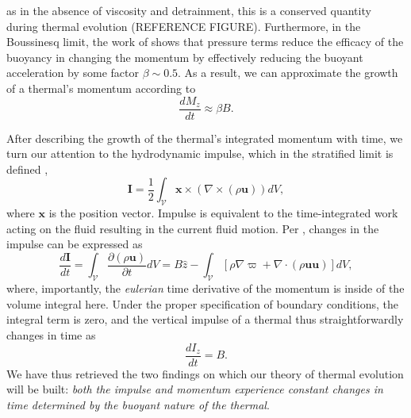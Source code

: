 \documentclass[twocolumn, amsmath, amsfonts, amssymb, trackchanges]{aastex62}
\newcommand{\Div}[1]{\ensuremath{\nabla\cdot\left( #1\right)}}
\newcommand{\grad}{\ensuremath{\nabla}}
\begin{document}
as in the absence of viscosity and detrainment, this is a conserved quantity during thermal evolution (REFERENCE FIGURE). 
Furthermore, in the Boussinesq limit, the work of \citet{tarshish&all2018} shows that pressure terms reduce the efficacy of the buoyancy in changing the momentum by effectively reducing the buoyant acceleration by some factor $\beta \sim 0.5$. 
As a result, we can approximate the growth of a thermal's momentum according to
\begin{equation}
\frac{d M_z}{dt} \approx \beta B.
\label{eqn:theory_momentum}
\end{equation}

After describing the growth of the thermal's integrated momentum with time, we turn our attention to the hydrodynamic impulse, which in the stratified limit is defined
\citep{shivamoggi2010},
\begin{equation}
\bm{I} = \frac{1}{2}\int_{\mathcal{V}} \bm{x}\times(\grad\times(\rho\bm{u}))dV,
\end{equation}
where $\bm{x}$ is the position vector. 
Impulse is equivalent to the time-integrated work acting on the fluid resulting in the current fluid motion. 
Per \citet{shivamoggi2010}, changes in the impulse can be expressed as
\begin{equation*}
\frac{d\bm{I}}{d t} = \int_{\mathcal{V}}\frac{\partial(\rho\bm{u})}{\partial t}dV
= B\hat{z} - \int_{\mathcal{V}}\left[\rho\grad\varpi + \Div{\rho\bm{u}\bm{u}}\right]dV ,
\end{equation*}
where, importantly, the \emph{eulerian} time derivative of the momentum is inside of the volume integral here. 
Under the proper specification of boundary conditions, the integral term is zero, and the vertical impulse of a thermal thus straightforwardly changes in time as
\begin{equation}
\frac{d I_z}{d t} = B.
\label{eqn:change_in_impulse}
\end{equation}
We have thus retrieved the two findings on which our theory of thermal evolution will be built: \emph{both the impulse and momentum experience constant changes in time determined by the buoyant nature of the thermal}.
\end{document}
